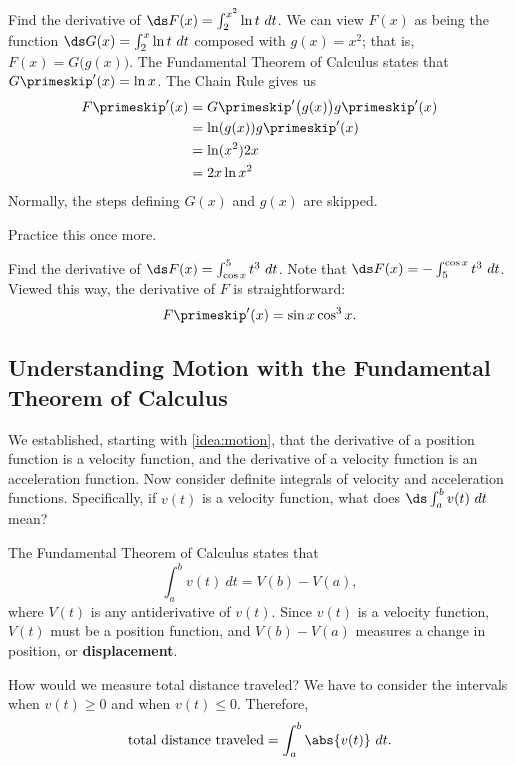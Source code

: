 \begin{example}\label{ex_ftc11}
Find the derivative of $\ds F(x) = \int_2^{x^2} \ln t\ dt$.
\solution
We can view $F(x)$ as being the function $\ds G(x) = \int_2^x \ln t\ dt$ composed with $g(x) = x^2$; that is, $F(x) = G\bigl(g(x)\bigr)$. The Fundamental Theorem of Calculus states that $G\primeskip'(x) = \ln x$. The Chain Rule gives us 
\begin{align*}
F\primeskip'(x) &= G\primeskip'\bigl(g(x)\bigr) g\primeskip'(x) \\
 			&= \ln (g(x)) g\primeskip'(x) \\
 			&= \ln (x^2) 2x \\
 			&=2x\ln x^2
\end{align*}
Normally, the steps defining $G(x)$ and $g(x)$ are skipped.
\end{example}

Practice this once more.

\begin{example}\label{ex_ftc12}
Find the derivative of $\ds F(x) = \int_{\cos x}^5 t^3\ dt$.
\solution
Note that $\ds F(x) = -\int_5^{\cos x} t^3\ dt$. Viewed this way, the derivative of $F$ is straightforward:
\[F\primeskip'(x) = \sin x \cos^3 x.\]
\end{example}

\subsection{Understanding Motion with the Fundamental Theorem of Calculus}

We established, starting with \autoref{idea:motion}, that the derivative of a position function is a velocity function, and the derivative of a velocity function is an acceleration function. Now consider definite integrals of velocity and acceleration functions. Specifically, if $v(t)$ is a velocity function, what does $\ds \int_a^b v(t)\ dt$ mean?

The Fundamental Theorem of Calculus states that
\[\int_a^b v(t)\ dt = V(b) - V(a),\]
where $V(t)$ is any antiderivative of $v(t)$. Since $v(t)$ is a velocity function, $V(t)$ must be a position function, and $V(b) - V(a)$ measures a change in position, or \textbf{displacement}.

How would we measure total distance traveled? We have to consider the intervals when $v(t)\geq 0$ and when $v(t)\leq 0$. Therefore,
\[\text{total distance traveled}=\int_a^b\abs{v(t)}\ dt.\]\bigskip

